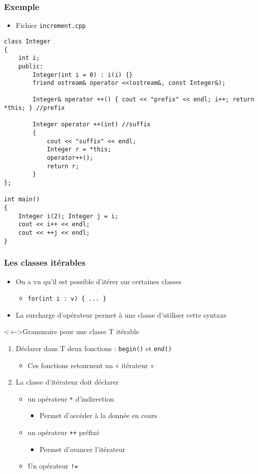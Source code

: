 \begin{frame}[containsverbatim]
\frametitle{Exemple}
\begin{itemize}
\item Fichier \texttt{increment.cpp}
\end{itemize}
\begin{lstlisting}
class Integer
{
	int i;
	public:
		Integer(int i = 0) : i(i) {}
		friend ostream& operator <<(ostream&, const Integer&);

		Integer& operator ++() { cout << "prefix" << endl; i++; return *this; } //prefix

		Integer operator ++(int) //suffix
		{ 
			cout << "suffix" << endl; 
			Integer r = *this; 
			operator++(); 
			return r;
		}
};

int main()
{
	Integer i(2); Integer j = i;
	cout << i++ << endl;
	cout << ++j << endl;	
}
\end{lstlisting}
\end{frame}

\begin{frame}
\frametitle{Les classes itérables}
\begin{itemize}[<+->]
\item On a vu qu'il est possible d'itérer sur certaines classes
	\begin{itemize}
	\item \lstinline|for(int i : v) { ... }|
	\end{itemize}
\item La surcharge d'opérateur permet à une classe d'utiliser cette syntaxe
\end{itemize}
\begin{exampleblock}<+->{Grammaire pour une classe T itérable}
	\begin{enumerate}[<+->]
	\item Déclarer dans T deux fonctions : \texttt{begin()} et \texttt{end()}
		\begin{itemize}
		\item Ces fonctions retournent un « itérateur »
		\end{itemize}
	\item La classe d'itérateur doit déclarer
		\begin{itemize}
		\item un opérateur \texttt{*} d'indirection
			\begin{itemize}
			\item Permet d'accéder à la donnée en cours
			\end{itemize}
		\item un opérateur \texttt{++} préfixé
			\begin{itemize}
			\item Permet d'avancer l'itérateur
			\end{itemize}
		\item Un opérateur \texttt{!=}
		\end{itemize}
	\end{enumerate}
\end{exampleblock}
\end{frame}

